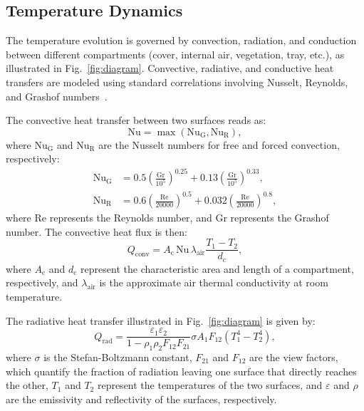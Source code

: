 \documentclass[conference]{IEEEtran}
\newcommand{\ui}[2]{#1_{\mathrm{#2}}}
\begin{document}
\subsection{Temperature Dynamics}\label{subsec:temperature}

The temperature evolution is governed by convection, radiation, and conduction between different compartments (cover, internal air, vegetation, tray, etc.), as illustrated in Fig.~\ref{fig:diagram}.
Convective, radiative, and conductive heat transfers are modeled using standard correlations involving Nusselt, Reynolds, and Grashof numbers~\cite{Ward2019,Vanthoor2011}.

The convective heat transfer between two surfaces reads as:
\begin{equation}
    \mathrm{Nu} = \max \left( \ui{\mathrm{Nu}}{G}, \ui{\mathrm{Nu}}{R} \right),
\end{equation}
where \(\ui{\mathrm{Nu}}{G}\) and \(\ui{\mathrm{Nu}}{R}\) are the Nusselt numbers for free and forced convection, respectively:
\begin{align}
    \ui{\mathrm{Nu}}{G} & = 0.5  {\left( \frac{\mathrm{Gr}}{10^5} \right)}^{0.25} + 0.13  {\left(\frac{\mathrm{Gr}}{10^5}\right)}^{0.33}, \\
    \ui{\mathrm{Nu}}{R} & = 0.6  {\left(\frac{\mathrm{Re}}{20000}\right)}^{0.5} + 0.032  {\left(\frac{\mathrm{Re}}{20000}\right)}^{0.8},
\end{align}
where \( \mathrm{Re} \) represents the Reynolds number, and \( \mathrm{Gr} \) represents the Grashof number. The convective heat flux is then:
\begin{equation}
    \ui{Q}{conv} = \ui{A}{c}\, \mathrm{Nu}\, \ui{\lambda}{air} \frac{\ui{T}{1} - \ui{T}{2}}{\ui{d}{c}},
\end{equation}
where \(\ui{A}{c}\) and \(\ui{d}{c}\) represent the characteristic area and length of a compartment, respectively, and \(\ui{\lambda}{air}\) is the approximate air thermal conductivity at room temperature.

The radiative heat transfer illustrated in Fig.~\ref{fig:diagram} is given by:
\begin{equation}
    \ui{Q}{rad} = \frac{\varepsilon_1  \varepsilon_2}{1 - \rho_1  \rho_2  \ui{F}{12}  \ui{F}{21}}  \sigma  \ui{A}{1}  \ui{F}{12}  \left( \ui{T}{1}^4 - \ui{T}{2}^4 \right),
\end{equation}
where \(\sigma \) is the Stefan-Boltzmann constant, \(\ui{F}{21}\) and \(\ui{F}{12}\) are the view factors, which quantify the fraction of radiation leaving one surface that directly reaches the other, \(\ui{T}{1}\) and \(\ui{T}{2}\) represent the temperatures of the two surfaces, and \(\varepsilon \) and \(\rho \) are the emissivity and reflectivity of the surfaces, respectively.
\end{document}
